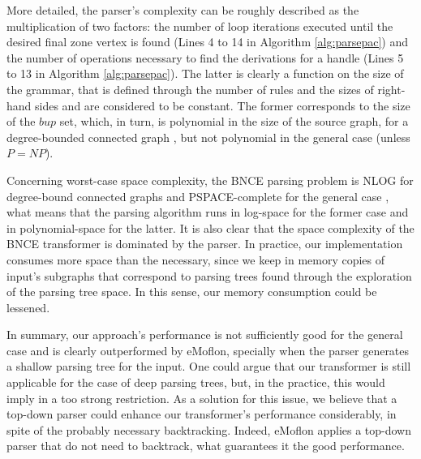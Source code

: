 More detailed, the parser's complexity can be roughly described as the multiplication of two factors: the number of loop iterations executed until the desired final zone vertex is found (Lines 4 to 14 in Algorithm \ref{alg:parsepac}) and the number of operations necessary to find the derivations for a handle (Lines 5 to 13 in Algorithm \ref{alg:parsepac}). The latter is clearly a function on the size of the grammar, that is defined through the number of rules and the sizes of right-hand sides and are considered to be constant. The former corresponds to the size of the $bup$ set, which, in turn, is polynomial in the size of the source graph, for a degree-bounded connected graph \cite[p. 161]{rozenberg1986boundary}, but not polynomial in the general case (unless $P=NP$).

Concerning worst-case space complexity, the BNCE parsing problem is NLOG for degree-bound connected graphs \cite{kim2001efficient} and PSPACE-complete for the general case \cite{rozenberg1986boundary}, what means that the parsing algorithm runs in log-space for the former case and in polynomial-space for the latter. It is also clear that the space complexity of the BNCE transformer is dominated by the parser. In practice, our implementation consumes more space than the necessary, since we keep in memory copies of input's subgraphs that correspond to parsing trees found through the exploration of the parsing tree space. In this sense, our memory consumption could be lessened.

In summary, our approach's performance is not sufficiently good for the general case and is clearly outperformed by eMoflon, specially when the parser generates a shallow parsing tree for the input. One could argue that our transformer is still applicable for the case of deep parsing trees, but, in the practice, this would imply in a too strong restriction. As a solution for this issue, we believe that a top-down parser could enhance our transformer's performance considerably, in spite of the probably necessary backtracking. Indeed, eMoflon applies a top-down parser that do not need to backtrack, what guarantees it the good performance.